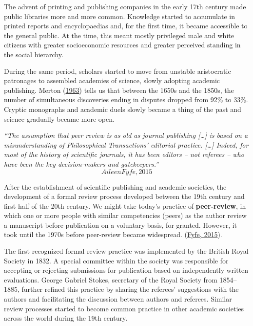 \documentclass[
]{book}
\begin{document}
The advent of printing and publishing companies in the early 17th century made public libraries more and more common. Knowledge started to accumulate in printed reports and encyclopaedias and, for the first time, it became accessible to the general public. At the time, this meant mostly privileged male and white citizens with greater socioeconomic resources and greater perceived standing in the social hierarchy.

During the same period, scholars started to move from unstable aristocratic patronages to assembled academies of science, slowly adopting academic publishing. Merton (\href{https://www.cambridge.org/core/journals/european-journal-of-sociology-archives-europeennes-de-sociologie/article/abs/resistance-to-the-systematic-study-of-multiple-discoveries-in-science/8FEC108B3D8B0DAD60416B36BE342959}{1963}) tells us that between the 1650s and the 1850s, the number of simultaneous discoveries ending in disputes dropped from 92\% to 33\%. Cryptic monographs and academic duels slowly became a thing of the past and science gradually became more open.

\emph{``The assumption that peer review is as old as journal publishing {[}\ldots{]} is based on a misunderstanding of Philosophical Transactions' editorial practice. {[}\ldots{]} Indeed, for most of the history of scientific journals, it has been editors -- not referees -- who have been the key decision-makers and gatekeepers.''}
\[Aileen Fyfe, 2015\]

After the establishment of scientific publishing and academic societies, the development of a formal review process developed between the 19th century and first half of the 20th century. We might take today's practice of \textbf{peer-review}, in which one or more people with similar competencies (peers) as the author review a manuscript before publication on a voluntary basis, for granted. However, it took until the 1970s before peer-review became widespread. (\href{https://web.archive.org/web/20220316123936/https:/www.timeshighereducation.com/features/peer-review-not-old-you-might-think}{Fyfe, 2015}).

The first recognized formal review practice was implemented by the British Royal Society in 1832. A special committee within the society was responsible for accepting or rejecting submissions for publication based on independently written evaluations. George Gabriel Stokes, secretary of the Royal Society from 1854--1885, further refined this practice by sharing the referees' suggestions with the authors and facilitating the discussion between authors and referees. Similar review processes started to become common practice in other academic societies across the world during the 19th century.
\end{document}
